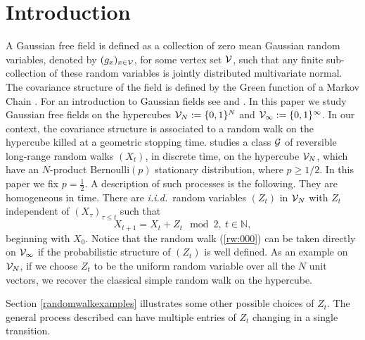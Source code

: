 \documentclass[preprint,11pt]{elsarticle}
\theoremstyle{remark}
\def\iid{\emph{i.i.d.}~}
\begin{document}
\section{Introduction}\label{Intro:sec}
 A Gaussian free field is defined as a collection of zero mean Gaussian random variables, denoted by $(g_x)_{x \in \cal{V}}$,  for some vertex set $\cal{V}$,
 such that any finite sub-collection of these  random variables is jointly distributed multivariate normal. The covariance structure of the field is defined by the Green function of a  Markov Chain \citep{D1984}. 
For an introduction to Gaussian fields see \cite{WP2020} and \cite{B2016}.
In this paper we study Gaussian free fields on the hypercubes
${\cal V}_N:= \{0,1\}^N$ and ${\cal V}_\infty := \{0,1\}^\infty$.  In our context, the covariance structure is associated to a random walk on the hypercube killed at a geometric stopping time.
\cite{CG2021} studies a class ${\cal G}$ of reversible long-range random walks $ (X_t)$, in discrete time, on the hypercube ${\cal V}_N$, which have an $N$-product Bernoulli$(p)$ stationary distribution,  where $p\ge 1/2$. In this paper we fix $p=\frac{1}{2}$. A description of such processes is the following.  They are  homogeneous in time. There are \iid  random variables $(Z_t)$ in ${\cal V}_N$ with $Z_t$ independent of $(X_\tau)_{\tau \leq t}$ %
such that 
\begin{equation}
X_{t+1} = X_t + Z_t \mod 2,\ t\in \mathbb{N},
\label{rw:000}
\end{equation}
beginning with $X_0$.
Notice that the random walk (\ref{rw:000}) can be taken directly on ${\cal V}_\infty$ if the probabilistic structure of $(Z_t)$ is well defined. 
 As an example on ${\cal V}_N$, if we choose $Z_t$ to be the uniform random variable over all the $N$ unit vectors, we recover the classical simple random walk on the hypercube. 

Section \ref{randomwalkexamples} illustrates some other possible choices of $Z_t$. The general  process described can have  multiple entries of $Z_t$ changing in a single transition.
\end{document}
